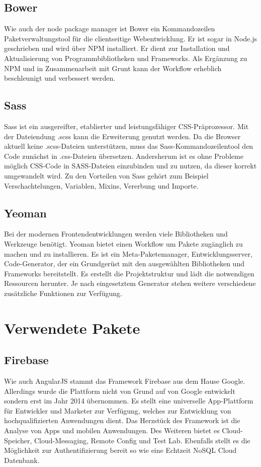 \subsection{Bower}
Wie auch der node package manager ist Bower ein Kommandozeilen Paketverwaltungstool für die clientseitige Webentwicklung. Er ist sogar in Node.js geschrieben und wird über NPM installiert. Er dient zur Installation und Aktualisierung von Programmbibliotheken und Frameworks. Als Ergänzung zu NPM und in Zusammenarbeit mit Grunt kann der Workflow erheblich beschleunigt und verbessert werden. 

\subsection{Sass}
Sass ist ein ausgereifter, etablierter und leistungsfähiger CSS-Präprozessor. Mit der Dateiendung .scss kann die Erweiterung genutzt werden. Da die Browser aktuell keine .scss-Dateien unterstützen, muss das Sass-Kommandozeilentool den Code zunächst in .css-Dateien übersetzen.  Andersherum ist es ohne Probleme möglich CSS-Code in SASS-Dateien einzubinden und zu nutzen, da dieser korrekt umgewandelt wird. Zu den Vorteilen von Sass gehört zum Beispiel Verschachtelungen, Variablen, Mixins, Vererbung und Importe.

\subsection{Yeoman}
Bei der modernen Frontendentwicklungen werden viele Bibliotheken und Werkzeuge benötigt. Yeoman bietet einen Workflow um Pakete zugänglich zu machen und zu installieren. Es ist ein Meta-Paketemanager, Entwicklungsserver, Code-Generator, der ein Grundgerüst mit den ausgewählten Bibliotheken und Frameworks bereitstellt. Es erstellt die Projektstruktur und lädt die notwendigen Ressourcen herunter. Je nach eingesetztem Generator stehen weitere verschiedene zusätzliche Funktionen zur Verfügung. 

\section{Verwendete Pakete}
\subsection{Firebase}
Wie auch AngularJS stammt das Framework Firebase aus dem Hause Google. Allerdings wurde die Plattform nicht von Grund auf von Google entwickelt sondern erst im Jahr 2014 übernommen. Es stellt eine universelle App-Plattform für Entwickler und Marketer zur Verfügung, welches zur Entwicklung von hochqualifizierten Anwendungen dient. Das Herzstück des Framework ist die Analyse von Apps und mobilen Anwendungen. Des Weiteren bietet es Cloud-Speicher, Cloud-Messaging, Remote Config und Test Lab. Ebenfalls stellt es die Möglichkeit zur Authentifizierung bereit so wie eine Echtzeit NoSQL Cloud Datenbank. 

